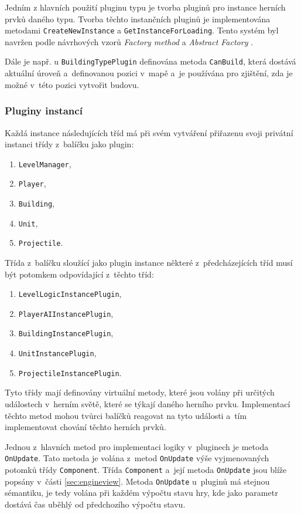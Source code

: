 Jedním z hlavních použití pluginu typu je tvorba pluginů pro instance herních prvků daného typu. Tvorba těchto instančních pluginů je implementována metodami \texttt{CreateNewInstance} a \texttt{GetInstanceForLoading}. Tento systém byl navržen podle návrhových vzorů \textit{Factory method} \citep[str.~107]{book:gangoffour} a \textit{Abstract Factory} \citep[str.~87]{book:gangoffour}.

Dále je např. u \texttt{BuildingTypePlugin} definována metoda \texttt{CanBuild}, která dostává aktuální úroveň a~definovanou pozici v~mapě a~je používána pro zjištění, zda je možné v~této pozici vytvořit budovu.

\subsubsection{Pluginy instancí}
Každá instance následujících tříd má při svém vytváření přiřazenu svoji privátní instanci třídy z~balíčku jako plugin:
\begin{enumerate}
	\item\texttt{LevelManager}, 
	\item\texttt{Player}, 
	\item\texttt{Building},
	\item\texttt{Unit},
	\item\texttt{Projectile}.
\end{enumerate}
   
Třída z~balíčku sloužící jako plugin instance některé z~předcházejících tříd musí být potomkem odpovídající z~těchto tříd:

\begin{enumerate}
	\item\texttt{LevelLogicInstancePlugin}, 
	\item\texttt{PlayerAIInstancePlugin}, 
	\item\texttt{BuildingInstancePlugin}, 
	\item\texttt{UnitInstancePlugin}, 
	\item\texttt{ProjectileInstancePlugin}.
\end{enumerate}

Tyto třídy mají definovány virtuální metody, které jsou volány při určitých událostech v~herním světě, které se týkají daného herního prvku. Implementací těchto metod mohou tvůrci balíčků reagovat na tyto události a~tím implementovat chování těchto herních prvků.

Jednou z~hlavních metod pro implementaci logiky v~pluginech je metoda \texttt{OnUpdate}. Tato metoda je volána z~metod \texttt{OnUpdate} výše vyjmenovaných potomků třídy \texttt{Component}. Třída \texttt{Component} a~její metoda \texttt{OnUpdate} jsou blíže popsány v~části \ref{sec:engineview}. Metoda \texttt{OnUpdate} u~pluginů má stejnou sémantiku, je tedy volána při každém výpočtu stavu hry, kde jako parametr dostává čas uběhlý od předchozího výpočtu stavu.

